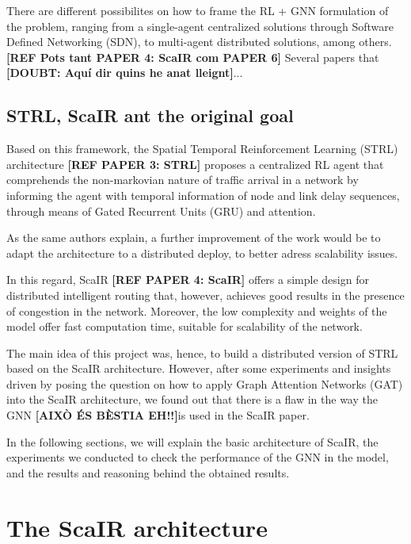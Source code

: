 \documentclass[10pt,twocolumn,letterpaper]{article}
\begin{document}
There are different possibilites on how to frame the RL + GNN formulation of the problem, ranging from a single-agent centralized solutions through Software Defined Networking (SDN), to multi-agent distributed solutions, among others. \textbf{[REF Pots tant PAPER 4: ScaIR com PAPER 6]} Several papers that \textbf{[DOUBT: Aquí dir quins he anat lleignt]}...

\subsection{STRL, ScaIR ant the original goal}

Based on this framework, the Spatial Temporal Reinforcement Learning (STRL) architecture \textbf{[REF PAPER 3: STRL]} proposes a centralized RL agent that comprehends the non-markovian nature of traffic arrival in a network by informing the agent with temporal information of node and link delay sequences, through means of Gated Recurrent Units (GRU) and attention.

As the same authors explain, a further improvement of the work would be to adapt the architecture to a distributed deploy, to better adress scalability issues.

In this regard, ScaIR \textbf{[REF PAPER 4: ScaIR]} offers a simple design for distributed intelligent routing that, however, achieves good results in the presence of congestion in the network. Moreover, the low complexity and weights of the model offer fast computation time, suitable for scalability of the network.

The main idea of this project was, hence, to build a distributed version of STRL based on the ScaIR architecture. However, after some experiments and insights driven by posing the question on how to apply Graph Attention Networks (GAT) into the ScaIR architecture, we found out that there is a flaw in the way the GNN \textbf{[AIXÒ ÉS BÈSTIA EH!!]}is used in the ScaIR paper.

In the following sections, we will explain the basic architecture of ScaIR, the experiments we conducted to check the performance of the GNN in the model, and the results and reasoning behind the obtained results.


\section{The ScaIR architecture}
\end{document}
